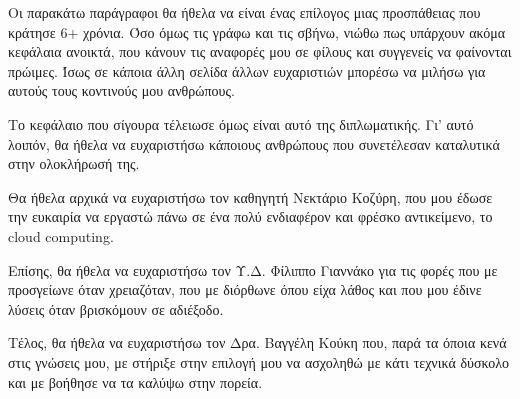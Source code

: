 \begin{acknowledgementsgr}
	Οι παρακάτω παράγραφοι θα ήθελα να είναι ένας επίλογος μιας προσπάθειας 
	που κράτησε 6+ χρόνια. Όσο όμως τις γράφω και τις σβήνω, νιώθω πως 
	υπάρχουν ακόμα κεφάλαια ανοικτά, που κάνουν τις αναφορές μου σε φίλους 
	και συγγενείς να φαίνονται πρώιμες. Ίσως σε κάποια άλλη σελίδα άλλων 
	ευχαριστιών μπορέσω να μιλήσω για αυτούς τους κοντινούς μου ανθρώπους.

	Το κεφάλαιο που σίγουρα τέλειωσε όμως είναι αυτό της διπλωματικής. Γι' 
	αυτό λοιπόν, θα ήθελα να ευχαριστήσω κάποιους ανθρώπους που συνετέλεσαν 
	καταλυτικά στην ολοκλήρωσή της.
	
	Θα ήθελα αρχικά να ευχαριστήσω τον καθηγητή Νεκτάριο Κοζύρη, που μου 
	έδωσε την ευκαιρία να εργαστώ πάνω σε ένα πολύ ενδιαφέρον και φρέσκο 
	αντικείμενο, το cloud computing.

	Επίσης, θα ήθελα να ευχαριστήσω τον Υ.Δ. Φίλιππο Γιαννάκο για τις φορές 
	που με προσγείωνε όταν χρειαζόταν, που με διόρθωνε όπου είχα λάθος και 
	που μου	έδινε λύσεις όταν βρισκόμουν σε αδιέξοδο.

	Τέλος, θα ήθελα να ευχαριστήσω τον Δρα. Βαγγέλη Κούκη που, παρά τα 
	όποια κενά στις γνώσεις μου, με στήριξε στην επιλογή μου να ασχοληθώ με 
	κάτι τεχνικά δύσκολο και με βοήθησε να τα καλύψω στην πορεία.
\end{acknowledgementsgr}
